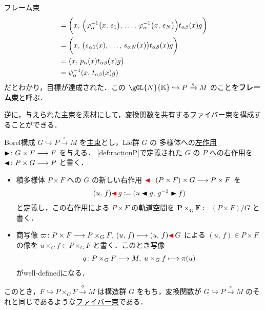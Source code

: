 \documentclass[TQFT_main]{subfiles}
\begin{document}
\begin{myexample}[label=def:framebundle]{フレーム束}
\begin{align}
        &= \biggl(x,\, \Bigl(\varphi_\alpha^{-1}\bigl(x,\, e_1\bigr) ,\, \dots,\, \varphi_\alpha^{-1}\bigl(x,\, e_N\bigr)\Bigr) t_{\alpha\beta}(x)g\biggr) \\
        &= \biggl(x,\, \bigl(s_\alpha{}_{1}(x),\, \dots,\, s_\alpha{}_N(x)\bigr) t_{\alpha\beta}(x)g\biggr) \\
        &= \bigl(x,\, p_{\alpha} (x) t_{\alpha\beta}(x) g\bigr) \\
        &= \psi_\alpha^{-1} (x,\, t_{\alpha\beta}(x) g)
    \end{align}
    だとわかり，目標が達成された．この $\gGL{N}{\mathbb{K}} \hookrightarrow P \xrightarrow{\pi} M$ のことを\textbf{フレーム束}と呼ぶ．
\end{myexample}

逆に，与えられた主束を素材にして，変換関数を共有するファイバー束を構成することができる．

\begin{myprop}[label=prop:Borelconst,breakable]{Borel構成}
    $G \hookrightarrow P \xrightarrow{\pi} M$ を\hyperref[def.PFD]{主束}とし，Lie群 $G$ の \cinfty 多様体への\hyperref[def:Lie-action]{左作用} $\blacktriangleright \colon G \times F \longrightarrow F$ を与える．
    \eqref{def:ractionP}で定義された $G$ の \underline{$P$ への右作用}を $\blacktriangleleft \colon P \times G \longrightarrow P$ と書く．
    \begin{itemize}
        \item 積多様体 $P \times F$ への $G$ の新しい右作用 $\textcolor{red}{\blacktriangleleft} \colon (P \times F) \times G \longrightarrow P \times F$ を
        \begin{align}
            (u,\, f) \textcolor{red}{\blacktriangleleft}\, g \coloneqq (u \blacktriangleleft g,\, g^{-1} \blacktriangleright f)
        \end{align}
        と定義し，この右作用による $P \times F$ の軌道空間を $\bm{P \times_G F} \coloneqq (P \times F) / G$ と書く．
        \item 商写像 $\varpi\colon P \times F \longrightarrow P \times _G F,\; (u,\, f) \longmapsto (u,\, f) \textcolor{red}{\blacktriangleleft}\, G$ による $(u,\, f) \in P \times F$ の像を $u \times_G f \in P \times_G F$ と書く．このとき写像
        \begin{align}
            q \colon P \times_G F \longrightarrow M,\; u \times_G f \longmapsto \pi (u)
        \end{align}
        がwell-definedになる．
    \end{itemize}
    このとき，$F \hookrightarrow P \times_G F \xrightarrow{q} M$ は構造群 $G$ をもち，変換関数が $G \hookrightarrow P \xrightarrow{\pi} M$ のそれと同じであるような\hyperref[def.fiber-1]{ファイバー束}である．
\end{myprop}
\end{document}
